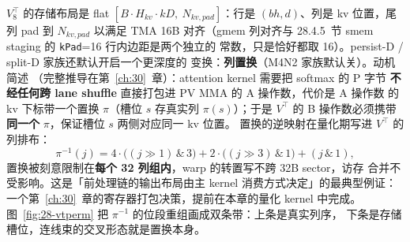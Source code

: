 $V_8^{\top}$ 的存储布局是 flat $[B\cdot H_{kv}\cdot kD,\ N_{kv,pad}]$：行是
$(bh, d)$、列是 kv 位置，尾列 pad 到 $N_{kv,pad}$ 以满足 TMA 16B 对齐（gmem
列对齐与 28.4.5~节 smem staging 的 \texttt{kPad}=16 行内边距是两个独立的
常数，只是恰好都取 16）。persist-D / split-D 家族还默认开启一个更深度的
变换：\textbf{列置换}（M4N2 家族默认关）。动机简述
（完整推导在第~\ref{ch:30}~章）：attention kernel 需要把 softmax 的 P 字节
\textbf{不经任何跨 lane shuffle} 直接打包进 PV MMA 的 A 操作数，代价是 A 操作数
的 kv 下标带一个置换 $\pi$（槽位 $s$ 存真实列 $\pi(s)$）；于是 $V^{\top}$ 的
B 操作数必须携带\textbf{同一个} $\pi$，保证槽位 $s$ 两侧对应同一 kv 位置。
置换的逆映射在量化期写进 $V^{\top}$ 的列排布：
\begin{equation}
  \pi^{-1}(j) = 4\cdot\big((j\!\gg\!1)\,\&\,3\big) + 2\cdot\big((j\!\gg\!3)\,\&\,1\big)
  + (j\,\&\,1),
  \label{eq:28-vtperm}
\end{equation}
置换被刻意限制在\textbf{每个 32 列组内}，warp 的转置写不跨 32B sector，访存
合并不受影响。这是「前处理链的输出布局由主 kernel 消费方式决定」的最典型例证：
一个第~\ref{ch:30}~章的寄存器打包决策，提前在本章的量化 kernel 中完成。
图~\ref{fig:28-vtperm} 把 $\pi^{-1}$ 的位段重组画成双条带：上条是真实列序，
下条是存储槽位，连线束的交叉形态就是置换本身。

